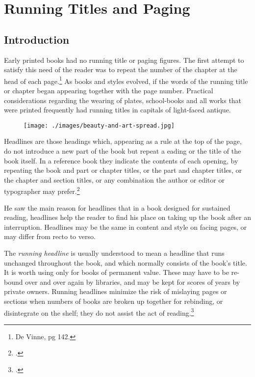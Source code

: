 

\chapter{Running Titles and Paging}

\section{Introduction}
\thispagestyle{plain}

Early printed books had no running title or paging figures. The first attempt to satisfy this need of the reader was to repeat the number of the chapter at the head of each page.\footnote{De Vinne, pg 142.}  As books and styles evolved, if the words of the running title or chapter began appearing together with the page number. Practical considerations regarding the wearing of plates, school-books and all works that were printed frequently had running titles in capitals of light-faced antique. 

\begin{figure}[htp]
\texttt{[image: ./images/beauty-and-art-spread.jpg]}
\end{figure}

Headlines are those headings which, appearing as a rule at the top of the page, do not introduce a new part of the book
but repeat a eading or the title of the book itself. In a reference book they indicate the contents of each opening, by repeating the book and part or chapter titles, or the part
and chapter titles, or the chapter and section titles, or any combination
the author or editor or typographer may prefer.\footcite{williamson1956}

He saw the main reason for headlines that in a book designed for
sustained reading, headlines help the reader to find his place on taking up the book after an interruption. Headlines may be the same in content and
style on facing pages, or may differ from recto to verso.

The \emph{running headline} is usually understood to mean a headline that
runs unchanged throughout the book, and which normally consists of the
book's title. It is worth using only for books of permanent value. These
may have to be re-bound over and over again by libraries, and may be kept
for scores of years by private owners. Running headlines minimize the
risk of mislaying pages or sections when numbers of books are broken up
together for rebinding, or disintegrate on the shelf; they do not assist the
act of reading.\footcite{williamson1956}


